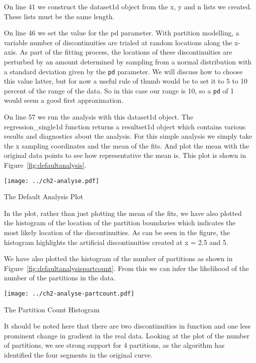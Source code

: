 \documentclass{tufte-handout}
\begin{document}
On line 41 we construct the dataset1d object from the x, y and n lists
we created.  These lists must be the same length.

On line 46 we set the value for the pd parameter. With partition
modelling, a variable number of discontinuities are trialed at random
locations along the x-axis. As part of the fitting process, the
locations of these discontinuities are perturbed by an amount
determined by sampling from a normal distribution with a standard
deviation given by the {\tt pd} parameter. We will discuss how to
choose this value latter, but for now a useful rule of thumb would be
to set it to 5 to 10 percent of the range of the data. So in this case
our range is 10, so a {\tt pd} of 1 would seem a good first
approximation.

On line 57 we run the analysis with this dataset1d object. The
regression\_single1d function returns a resultset1d object which
contains various results and diagnostics about the analysis. For this
simple analysis we simply take the x sampling coordinates and the mean
of the fits. And plot the mean with the original data points to see
how representative the mean is. This plot is shown in
Figure~\ref{fig:defaultanalysis}.

\begin{marginfigure}
\texttt{[image: ../ch2-analyse.pdf]}
\caption{The Default Analysis Plot}
\label{fig:defaultanalysis}
\end{marginfigure}

In the plot, rather than just plotting the mean of the fits, we have
also plotted the histogram of the location of the partition boundaries
which indicates the most likely location of the discontinuities. As
can be seen in the figure, the histogram highlights the artificial
discontinuities created at x = 2.5 and 5.

We have also plotted the histogram of the number of partitions as 
shown in Figure~\ref{fig:defaultanalysispartcount}. From this we 
can infer the likelihood of the number of the partitions in the
data.

\begin{marginfigure}
\texttt{[image: ../ch2-analyse-partcount.pdf]}
\caption{The Partition Count Histogram}
\label{fig:defaultanalysispartcount}
\end{marginfigure}

It should be noted here that there are two discontinuities in function and one less prominent
change in gradient in the real data. Looking at the plot of the number of partitions, we see strong support for 4 partitions,
as the algorithm has identified the four segments in the original curve.
\end{document}
